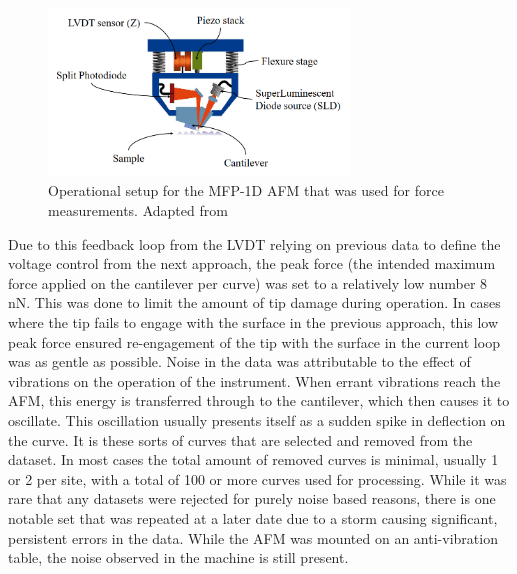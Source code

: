 \begin{figure}[h!]     %
        \begin{center}
          \includegraphics[width=80mm]{chapter2/Head.PNG}
\end{center}
\caption{Operational setup for the MFP-1D AFM that was used for force measurements. Adapted from \cite{AFMTalk}} %
\label{fig:Head.jpg}                 %
\end{figure}


Due to this feedback loop from the LVDT relying on previous data to define the voltage control from the next approach, the peak force (the intended maximum force applied on the cantilever per curve) was set to a relatively low number 8 nN. This was done to limit the amount of tip damage during operation. In cases where the tip fails to engage with the surface in the previous approach, this low peak force ensured re-engagement of the tip with the surface in the current loop was as gentle as possible. Noise in the data was attributable to the effect of vibrations on the operation of the instrument. When errant vibrations reach the AFM, this energy is transferred through to the cantilever, which then causes it to oscillate. This oscillation usually presents itself as a sudden spike in deflection on the curve. It is these sorts of curves that are selected and removed from the dataset. In most cases the total amount of removed curves is minimal, usually 1 or 2 per site, with a total of 100 or more curves used for processing. While it was rare that any datasets were rejected for purely noise based reasons, there is one notable set that was repeated at a later date due to a storm causing significant, persistent errors in the data. While the AFM was mounted on an anti-vibration table, the noise observed in the machine is still present.

